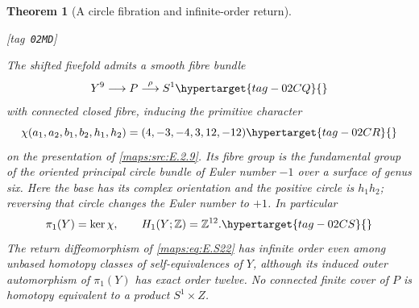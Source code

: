 \documentclass[11pt,a4paper]{article}
\makeatletter
\numberwithin{equation}{section}
\newtheorem{theorem}{Theorem}[section]
\theoremstyle{definition}
\newcommand{\StatementRecord}[4]{{\upshape\footnotesize[tag~\texttt{#3}]}\enspace\ignorespaces}
\newcommand{\SeriesRefText}[1]{\ifcsname SRef@#1\endcsname\csname SRef@#1\endcsname\else\textbf{UNRESOLVED}\fi}
\newcommand{\SeriesRef}[1]{\ifmmode\text{\SeriesRefText{#1}}\else\SeriesRefText{#1}\fi}
\makeatother
\begin{document}
\begin{theorem}[A circle fibration and infinite-order return]\hypertarget{tag-02MD}{}\label{maps:src:E.2.13}
\StatementRecord{maps:src:E.2.13}{proved}{02MD}{\cref{maps:src:E.2.9}, \eqref{maps:eq:E.S26}, \cref{maps:src:E.2.12}, \SeriesRef{maps:src:B.6.24}; \cite[Theorem 3.6]{rootScott83}}


The shifted fivefold admits a smooth fibre bundle
\begin{equation}
                  Y^9\longrightarrow P\stackrel{\rho}{\longrightarrow}S^1
 \hypertarget{tag-02CQ}{}\label{maps:eq:E.S22}
\end{equation}
with connected closed fibre, inducing the primitive character
\begin{equation}
 \chi(a_1,a_2,b_1,b_2,h_1,h_2)
                    =(4,-3,-4,3,12,-12)
 \hypertarget{tag-02CR}{}\label{maps:eq:E.S23}
\end{equation}
on the presentation of \ref{maps:src:E.2.9}. Its fibre group is the fundamental
group of the oriented principal circle bundle of Euler number
$-1$ over a surface of genus six. Here the base has its complex
orientation and the positive circle is $h_1h_2$; reversing that
circle changes the Euler number to $+1$. In particular
\begin{equation}
 \pi_1(Y)=\ker\chi,\qquad H_1(Y;\mathbb Z)=\mathbb Z^{12}.
 \hypertarget{tag-02CS}{}\label{maps:eq:E.S24}
\end{equation}
The return diffeomorphism of \eqref{maps:eq:E.S22} has infinite order even
among unbased homotopy classes of self-equivalences of $Y$,
although its induced outer automorphism of $\pi_1(Y)$ has
exact order twelve. No connected finite cover of $P$ is
homotopy equivalent to a product $S^1\times Z$.


\end{theorem}
\end{document}
